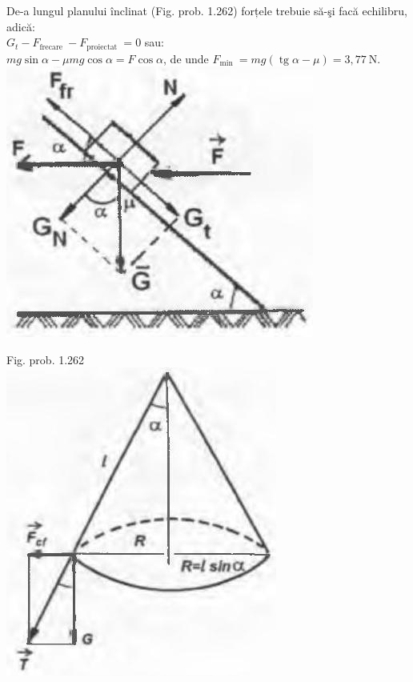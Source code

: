 \documentclass[10pt]{article}
\begin{document}
De-a lungul planului înclinat (Fig. prob. 1.262) forțele trebuie să-şi facă echilibru, adică:\\
$G_{t}-F_{\text {frecare }}-F_{\text {proiectat }}=0$ sau:\\
$m g \sin \alpha-\mu m g \cos \alpha=F \cos \alpha$, de unde $F_{\text {min }}=m g(\operatorname{tg} \alpha-\mu)=3,77 \mathrm{~N}$.\\
\includegraphics[max width=\textwidth, center]{2025_07_01_5b3ff9fa0d508c8e9f17g-254(1)}

Fig. prob. 1.262\\
\includegraphics[max width=\textwidth, center]{2025_07_01_5b3ff9fa0d508c8e9f17g-254}
\end{document}
